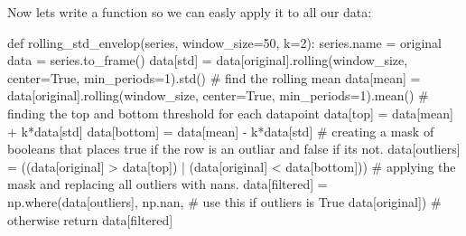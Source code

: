 \documentclass[
  letterpaper,
  DIV=11,
  numbers=noendperiod,
  oneside]{scrreprt}
\newenvironment{Shaded}{\begin{snugshade}}{\end{snugshade}}
\newcommand{\CommentTok}[1]{\textcolor[rgb]{0.37,0.37,0.37}{#1}}
\newcommand{\ControlFlowTok}[1]{\textcolor[rgb]{0.00,0.23,0.31}{#1}}
\newcommand{\DecValTok}[1]{\textcolor[rgb]{0.68,0.00,0.00}{#1}}
\newcommand{\KeywordTok}[1]{\textcolor[rgb]{0.00,0.23,0.31}{#1}}
\newcommand{\NormalTok}[1]{\textcolor[rgb]{0.00,0.23,0.31}{#1}}
\newcommand{\OperatorTok}[1]{\textcolor[rgb]{0.37,0.37,0.37}{#1}}
\newcommand{\StringTok}[1]{\textcolor[rgb]{0.13,0.47,0.30}{#1}}
\newcommand{\VariableTok}[1]{\textcolor[rgb]{0.07,0.07,0.07}{#1}}
\begin{document}
Now lets write a function so we can easly apply it to all our data:

\begin{Shaded}
\begin{Highlighting}[]
\KeywordTok{def}\NormalTok{ rolling\_std\_envelop(series, window\_size}\OperatorTok{=}\DecValTok{50}\NormalTok{, k}\OperatorTok{=}\DecValTok{2}\NormalTok{):}
\NormalTok{    series.name }\OperatorTok{=} \StringTok{\textquotesingle{}original\textquotesingle{}}
\NormalTok{    data }\OperatorTok{=}\NormalTok{ series.to\_frame()}
\NormalTok{    data[}\StringTok{\textquotesingle{}std\textquotesingle{}}\NormalTok{] }\OperatorTok{=}\NormalTok{ data[}\StringTok{\textquotesingle{}original\textquotesingle{}}\NormalTok{].rolling(window\_size, center}\OperatorTok{=}\VariableTok{True}\NormalTok{, min\_periods}\OperatorTok{=}\DecValTok{1}\NormalTok{).std()}
    \CommentTok{\# find the rolling mean}
\NormalTok{    data[}\StringTok{\textquotesingle{}mean\textquotesingle{}}\NormalTok{] }\OperatorTok{=}\NormalTok{ data[}\StringTok{\textquotesingle{}original\textquotesingle{}}\NormalTok{].rolling(window\_size, center}\OperatorTok{=}\VariableTok{True}\NormalTok{, min\_periods}\OperatorTok{=}\DecValTok{1}\NormalTok{).mean()}
    \CommentTok{\# finding the top and bottom threshold for each datapoint}
\NormalTok{    data[}\StringTok{\textquotesingle{}top\textquotesingle{}}\NormalTok{] }\OperatorTok{=}\NormalTok{ data[}\StringTok{\textquotesingle{}mean\textquotesingle{}}\NormalTok{] }\OperatorTok{+}\NormalTok{ k}\OperatorTok{*}\NormalTok{data[}\StringTok{\textquotesingle{}std\textquotesingle{}}\NormalTok{]}
\NormalTok{    data[}\StringTok{\textquotesingle{}bottom\textquotesingle{}}\NormalTok{] }\OperatorTok{=}\NormalTok{ data[}\StringTok{\textquotesingle{}mean\textquotesingle{}}\NormalTok{] }\OperatorTok{{-}}\NormalTok{ k}\OperatorTok{*}\NormalTok{data[}\StringTok{\textquotesingle{}std\textquotesingle{}}\NormalTok{]}
    \CommentTok{\# creating a mask of booleans that places true if the row is an outliar and false if its not.}
\NormalTok{    data[}\StringTok{\textquotesingle{}outliers\textquotesingle{}}\NormalTok{] }\OperatorTok{=}\NormalTok{ ((data[}\StringTok{\textquotesingle{}original\textquotesingle{}}\NormalTok{] }\OperatorTok{\textgreater{}}\NormalTok{ data[}\StringTok{\textquotesingle{}top\textquotesingle{}}\NormalTok{]) }\OperatorTok{|}\NormalTok{ (data[}\StringTok{\textquotesingle{}original\textquotesingle{}}\NormalTok{] }\OperatorTok{\textless{}}\NormalTok{ data[}\StringTok{\textquotesingle{}bottom\textquotesingle{}}\NormalTok{]))}
    \CommentTok{\# applying the mask and replacing all outliers with nans.}
\NormalTok{    data[}\StringTok{\textquotesingle{}filtered\textquotesingle{}}\NormalTok{] }\OperatorTok{=}\NormalTok{ np.where(data[}\StringTok{\textquotesingle{}outliers\textquotesingle{}}\NormalTok{],}
\NormalTok{                                np.nan,  }\CommentTok{\# use this if outliers is True}
\NormalTok{                                data[}\StringTok{\textquotesingle{}original\textquotesingle{}}\NormalTok{]) }\CommentTok{\# otherwise}
    \ControlFlowTok{return}\NormalTok{ data[}\StringTok{\textquotesingle{}filtered\textquotesingle{}}\NormalTok{]}
\end{Highlighting}
\end{Shaded}
\end{document}
